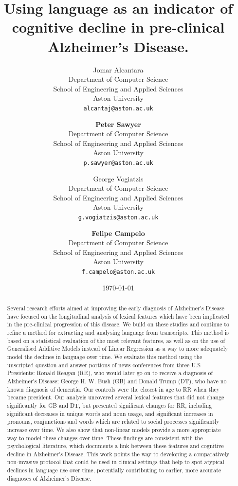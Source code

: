 \documentclass[12pt]{article}
\title{Using language as an indicator of cognitive decline in pre-clinical Alzheimer's Disease.}
\author{
	Jomar Alcantara \\
	Department of Computer Science\\
	School of Engineering and Applied Sciences\\
	Aston University\\
	\texttt{alcantaj@aston.ac.uk} \\
		\and
	\textbf{Peter Sawyer} \\
	Department of Computer Science\\
	School of Engineering and Applied Sciences\\
	Aston University\\
	\texttt{p.sawyer@aston.ac.uk} \\
		\and
	George Vogiatzis\\
	Department of Computer Science\\
	School of Engineering and Applied Sciences\\
	Aston University \\
	\texttt{g.vogiatzis@aston.ac.uk} \\
		\and
	\textbf{Felipe Campelo}\\
	Department of Computer Science\\
	School of Engineering and Applied Sciences\\
	Aston University\\
	\texttt{f.campelo@aston.ac.uk}
}
\date{\today}
\begin{document}
\bigskip
\begin{abstract}
Several research efforts aimed at improving the early diagnosis of Alzheimer's Disease have focused on the longitudinal analysis of lexical features which have been implicated in the pre-clinical progression of this disease. We build on these studies and continue to refine a method for extracting and analysing language from transcripts. This method is based on a statistical evaluation of the most relevant features, as well as on the use of Generalised Additive Models instead of Linear Regression as a way to more adequately model the declines in language over time. We evaluate this method using the unscripted question and answer portions of news conferences from three U.S Presidents: Ronald Reagan (RR), who would later go on to receive a diagnosis of Alzheimer's Disease; George H. W. Bush (GB) and Donald Trump (DT), who have no known diagnosis of dementia. Our controls were the closest in age to RR when they became president. Our analysis uncovered several lexical features that did not change significantly for GB and DT, but presented significant changes for RR, including significant decreases in unique words and noun usage, and significant increases in pronouns, conjunctions and words which are related to social processes significantly increase over time. We also show that non-linear models provide a more appropriate way to model these changes over time. These findings are consistent with the psychological literature, which documents a link between these features and cognitive decline in Alzheimer's Disease.  This work points the way to developing a comparatively non-invasive protocol that could be used in clinical settings that help to spot atypical declines in language use over time, potentially contributing to earlier, more accurate diagnoses of Alzheimer's Disease.
\end{abstract}

\maketitle
\end{document}
